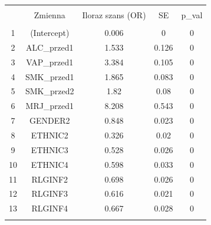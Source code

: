
\begin{tabular}{@{\extracolsep{5pt}} ccccc} 
\\[-1.8ex]\hline 
\hline \\[-1.8ex] 
 & Zmienna & Iloraz szans (OR) & SE & p\_val \\ 
\hline \\[-1.8ex] 
1 & (Intercept) & 0.006 & 0 & 0 \\ 
2 & ALC\_przed1 & 1.533 & 0.126 & 0 \\ 
3 & VAP\_przed1 & 3.384 & 0.105 & 0 \\ 
4 & SMK\_przed1 & 1.865 & 0.083 & 0 \\ 
5 & SMK\_przed2 & 1.82 & 0.08 & 0 \\ 
6 & MRJ\_przed1 & 8.208 & 0.543 & 0 \\ 
7 & GENDER2 & 0.848 & 0.023 & 0 \\ 
8 & ETHNIC2 & 0.326 & 0.02 & 0 \\ 
9 & ETHNIC3 & 0.528 & 0.026 & 0 \\ 
10 & ETHNIC4 & 0.598 & 0.033 & 0 \\ 
11 & RLGINF2 & 0.698 & 0.026 & 0 \\ 
12 & RLGINF3 & 0.616 & 0.021 & 0 \\ 
13 & RLGINF4 & 0.667 & 0.028 & 0 \\ 
\hline \\[-1.8ex] 
\end{tabular} 
